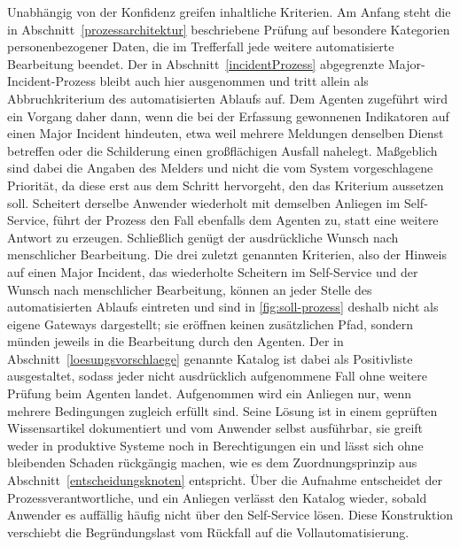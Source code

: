 Unabh\"angig von der Konfidenz greifen inhaltliche Kriterien. Am Anfang steht die in Abschnitt~\ref{prozessarchitektur} beschriebene Pr\"ufung auf besondere Kategorien personenbezogener Daten, die im Trefferfall jede weitere automatisierte Bearbeitung beendet. Der in Abschnitt~\ref{incidentProzess} abgegrenzte Major-Incident-Prozess bleibt auch hier ausgenommen und tritt allein als Abbruchkriterium des automatisierten Ablaufs auf. Dem Agenten zugef\"uhrt wird ein Vorgang daher dann, wenn die bei der Erfassung gewonnenen Indikatoren auf einen Major Incident hindeuten, etwa weil mehrere Meldungen denselben Dienst betreffen oder die Schilderung einen gro{\ss}fl\"achigen Ausfall nahelegt. Ma{\ss}geblich sind dabei die Angaben des Melders und nicht die vom System vorgeschlagene Priorit\"at, da diese erst aus dem Schritt hervorgeht, den das Kriterium aussetzen soll. Scheitert derselbe Anwender wiederholt mit demselben Anliegen im Self-Service, f\"uhrt der Prozess den Fall ebenfalls dem Agenten zu, statt eine weitere Antwort zu erzeugen. Schlie{\ss}lich gen\"ugt der ausdr\"uckliche Wunsch nach menschlicher Bearbeitung. Die drei zuletzt genannten Kriterien, also der Hinweis auf einen Major Incident, das wiederholte Scheitern im Self-Service und der Wunsch nach menschlicher Bearbeitung, k\"onnen an jeder Stelle des automatisierten Ablaufs eintreten und sind in \autoref{fig:soll-prozess} deshalb nicht als eigene Gateways dargestellt; sie er\"offnen keinen zus\"atzlichen Pfad, sondern m\"unden jeweils in die Bearbeitung durch den Agenten. Der in Abschnitt~\ref{loesungsvorschlaege} genannte Katalog ist dabei als Positivliste ausgestaltet, sodass jeder nicht ausdr\"ucklich aufgenommene Fall ohne weitere Pr\"ufung beim Agenten landet. Aufgenommen wird ein Anliegen nur, wenn mehrere Bedingungen zugleich erf\"ullt sind. Seine L\"osung ist in einem gepr\"uften Wissensartikel dokumentiert und vom Anwender selbst ausf\"uhrbar, sie greift weder in produktive Systeme noch in Berechtigungen ein und l\"asst sich ohne bleibenden Schaden r\"uckg\"angig machen, wie es dem Zuordnungsprinzip aus Abschnitt~\ref{entscheidungsknoten} entspricht. \"Uber die Aufnahme entscheidet der Prozessverantwortliche, und ein Anliegen verl\"asst den Katalog wieder, sobald Anwender es auff\"allig h\"aufig nicht \"uber den Self-Service l\"osen. Diese Konstruktion verschiebt die Begr\"undungslast vom R\"uckfall auf die Vollautomatisierung.

